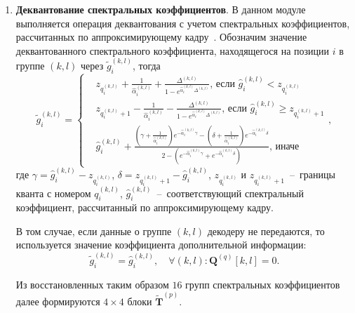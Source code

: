 \begin{enumerate}
  \item \textbf{Деквантование спектральных коэффициентов}. В данном модуле выполняется операция деквантования с учетом спектральных коэффициентов, рассчитанных по аппроксимирующему кадру~\cite{Kubasov07optimalreconstruction}. Обозначим значение деквантованного спектрального коэффициента, находящегося на позиции $i$ в группе $(k,l)$ через $\tilde{g}_i^{(k,l)}$, тогда
  \begin{equation*}
  \tilde{g}_i^{(k,l)} = \begin{cases}
  & z_{q^{(k,l)}_i} + \frac{1}{\hat{\alpha}^{(k,l)}_i} + \frac{\Delta^{(k,l)}}{1-e^{\hat{\alpha}^{(k,l)}_i\Delta^{(k,l)}}}\text{, если $\hat{g}_i^{(k,l)} < z_{q^{(k,l)}_i}$} \\
  & z_{q^{(k,l)}_i+1} - \frac{1}{\hat{\alpha}^{(k,l)}_i} - \frac{\Delta^{(k,l)}}{1-e^{\hat{\alpha}^{(k,l)}_i\Delta^{(k,l)}}}\text{, если $\hat{g}_i^{(k,l)} \geq z_{q^{(k,l)}_i+1}$} \\
  & \hat{g}_i^{(k,l)} + \frac{\left(\gamma + \frac{1}{\hat{\alpha}^{(k,l)}_i}\right)e^{-\hat{\alpha}^{(k,l)}_i\gamma} - \left(\delta + \frac{1}{\hat{\alpha}^{(k,l)}_i}\right)e^{-\hat{\alpha}^{(k,l)}_i\delta}} {2-\left(e^{-\hat{\alpha}^{(k,l)}_i\gamma}+e^{-\hat{\alpha}^{(k,l)}_i\delta}\right)} \text{, иначе}
  \end{cases},
  \end{equation*}
  где $\gamma = \hat{g}_i^{(k,l)} - z_{q^{(k,l)}_i}$, $\delta = z_{q^{(k,l)}_i+1} - \hat{g}_i^{(k,l)}$, $z_{q^{(k,l)}_i}$ и $z_{q^{(k,l)}_i+1}$~--~границы кванта с номером $q^{(k,l)}_i$, $\hat{g}_i^{(k,l)}$~--~соответствующий спектральный коэффициент, рассчитанный по аппроксимирующему кадру.
  
  В том случае, если данные о группе $(k,l)$ декодеру не передаются, то используется значение коэффициента дополнительной информации:
  \begin{equation*}
  \tilde{g}_i^{(k,l)} = \hat{g}_i^{(k,l)}, \quad \forall (k,l) : \mathbf{Q}^{(q)}[k,l] = 0.
  \end{equation*}
  
  Из восстановленных таким образом $16$ групп спектральных коэффициентов далее формируются $4\times4$ блоки $\widetilde{\mathbf{T}}^{(p)}$.
  

\end{enumerate}
